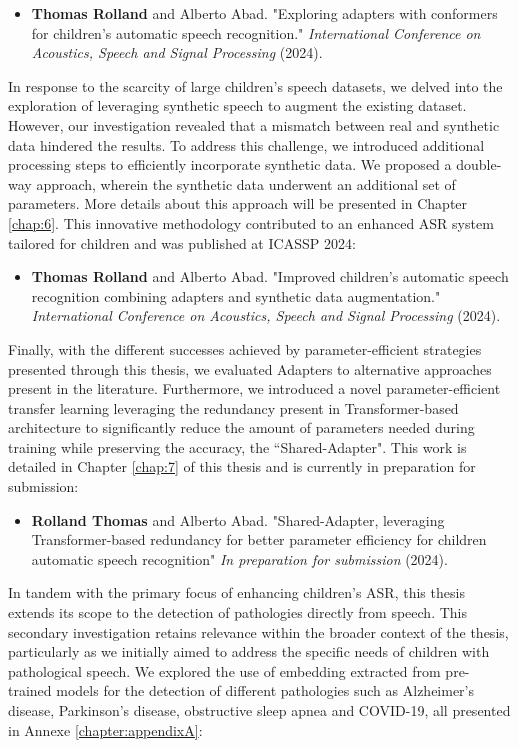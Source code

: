\begin{itemize}
    \item \textbf{Thomas Rolland} and Alberto Abad. "Exploring adapters with conformers for children’s automatic speech recognition." \textit{ International Conference on Acoustics, Speech and Signal Processing} (2024).
\end{itemize}

In response to the scarcity of large children's speech datasets, we delved into the exploration of leveraging synthetic speech to augment the existing dataset. However, our investigation revealed that a mismatch between real and synthetic data hindered the results. To address this challenge, we introduced additional processing steps to efficiently incorporate synthetic data. We proposed a double-way approach, wherein the synthetic data underwent an additional set of parameters. More details about this approach will be presented in Chapter \ref{chap:6}. This innovative methodology contributed to an enhanced \ac{ASR} system tailored for children and was published at ICASSP 2024:

\begin{itemize}
    \item \textbf{Thomas Rolland} and Alberto Abad. "Improved children’s automatic speech recognition combining adapters and synthetic data augmentation." \textit{International Conference on Acoustics, Speech and Signal Processing} (2024).
\end{itemize}

Finally, with the different successes achieved by parameter-efficient strategies presented through this thesis, we evaluated Adapters to alternative approaches present in the literature. Furthermore, we introduced a novel parameter-efficient transfer learning leveraging the redundancy present in Transformer-based architecture to significantly reduce the amount of parameters needed during training while preserving the accuracy, the ``Shared-Adapter". This work is detailed in Chapter \ref{chap:7} of this thesis and is currently in preparation for submission:
\begin{itemize}
    \item \textbf{Rolland Thomas} and Alberto Abad. "Shared-Adapter, leveraging Transformer-based redundancy for better parameter efficiency for children automatic speech recognition" \textit{In preparation for submission} (2024).
\end{itemize}

In tandem with the primary focus of enhancing children's \ac{ASR}, this thesis extends its scope to the detection of pathologies directly from speech. This secondary investigation retains relevance within the broader context of the thesis, particularly as we initially aimed to address the specific needs of children with pathological speech. We explored the use of embedding extracted from pre-trained models for the detection of different pathologies such as Alzheimer's disease, Parkinson's disease, obstructive sleep apnea and COVID-19, all presented in Annexe \ref{chapter:appendixA}:

